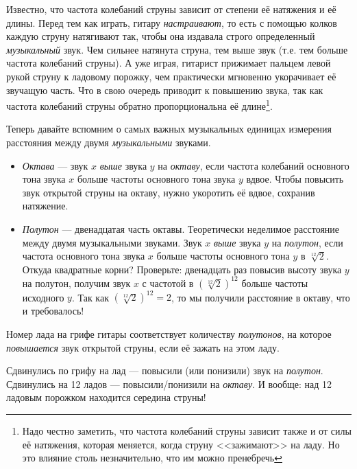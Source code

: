 Известно, что частота колебаний струны зависит от степени её натяжения и её длины. Перед тем как играть, гитару \emph{настраивают}, то есть с помощью колков каждую струну натягивают так, чтобы она издавала строго определенный \emph{музыкальный} звук. Чем сильнее натянута струна, тем выше звук (т.е. тем больше частота колебаний струны). А уже играя, гитарист прижимает пальцем левой рукой струну к ладовому порожку, чем практически мгновенно укорачивает её звучащую часть. Что в свою очередь приводит к повышению звука, так как частота колебаний струны обратно пропорциональна её длине\footnote{Надо честно заметить, что частота колебаний струны зависит также и от силы её натяжения, которая меняется, когда струну <<зажимают>> на ладу. Но это влияние столь незначительно, что им можно пренебречь}.

Теперь давайте вспомним о самых важных музыкальных единицах измерения расстояния между двумя \emph{музыкальными} звуками.
\begin{itemize}
    \item \emph{Октава} --- звук $x$ \emph{выше} звука $y$ на \emph{октаву}, если частота колебаний основного тона звука $x$ больше частоты основного тона звука $y$ вдвое. Чтобы повысить звук открытой струны на октаву, нужно укоротить её вдвое, сохранив натяжение.
    
    \item \emph{Полутон} --- двенадцатая часть октавы. Теоретически неделимое расстояние между двумя музыкальными звуками. Звук $x$ \emph{выше} звука $y$ на \emph{полутон}, если частота основного тона звука $x$ больше частоты основного тона $y$ в $\sqrt[12]{2}$. Откуда квадратные корни? Проверьте: двенадцать раз повысив высоту звука $y$ на полутон, получим звук $x$ с частотой в $(\sqrt[12]{2})^{12}$ больше частоты исходного $y$. Так как $(\sqrt[12]{2})^{12} = 2$, то мы получили расстояние в октаву, что и требовалось! 
\end{itemize}


\begin{Definition}
    Номер лада на грифе гитары соответствует количеству \emph{полутонов}, на которое \emph{повышается} звук открытой струны, если её зажать на этом ладу.
\end{Definition}

Сдвинулись по грифу на лад --- повысили (или понизили) звук на \emph{полутон}. Сдвинулись на 12 ладов --- повысили/понизили на \emph{октаву}. И вообще: над 12 ладовым порожком находится середина струны!

